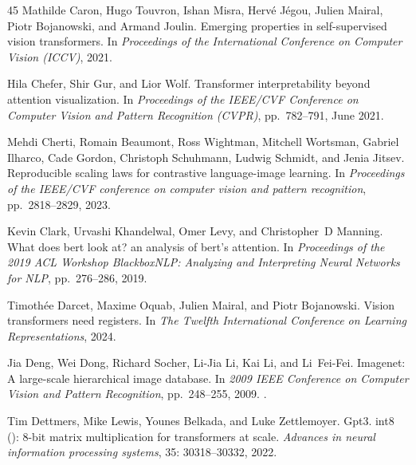\documentclass{article}
\begin{document}
\begin{thebibliography}{45}
Mathilde Caron, Hugo Touvron, Ishan Misra, Herv\'e J\'egou, Julien Mairal, Piotr Bojanowski, and Armand Joulin.
\newblock Emerging properties in self-supervised vision transformers.
\newblock In \emph{Proceedings of the International Conference on Computer Vision (ICCV)}, 2021.

Hila Chefer, Shir Gur, and Lior Wolf.
\newblock Transformer interpretability beyond attention visualization.
\newblock In \emph{Proceedings of the IEEE/CVF Conference on Computer Vision and Pattern Recognition (CVPR)}, pp.\  782--791, June 2021.

Mehdi Cherti, Romain Beaumont, Ross Wightman, Mitchell Wortsman, Gabriel Ilharco, Cade Gordon, Christoph Schuhmann, Ludwig Schmidt, and Jenia Jitsev.
\newblock Reproducible scaling laws for contrastive language-image learning.
\newblock In \emph{Proceedings of the IEEE/CVF conference on computer vision and pattern recognition}, pp.\  2818--2829, 2023.

Kevin Clark, Urvashi Khandelwal, Omer Levy, and Christopher~D Manning.
\newblock What does bert look at? an analysis of bert’s attention.
\newblock In \emph{Proceedings of the 2019 ACL Workshop BlackboxNLP: Analyzing and Interpreting Neural Networks for NLP}, pp.\  276--286, 2019.

Timoth{\'e}e Darcet, Maxime Oquab, Julien Mairal, and Piotr Bojanowski.
\newblock Vision transformers need registers.
\newblock In \emph{The Twelfth International Conference on Learning Representations}, 2024.

Jia Deng, Wei Dong, Richard Socher, Li-Jia Li, Kai Li, and Li~Fei-Fei.
\newblock Imagenet: A large-scale hierarchical image database.
\newblock In \emph{2009 IEEE Conference on Computer Vision and Pattern Recognition}, pp.\  248--255, 2009.
\newblock {}.

Tim Dettmers, Mike Lewis, Younes Belkada, and Luke Zettlemoyer.
\newblock Gpt3. int8 (): 8-bit matrix multiplication for transformers at scale.
\newblock \emph{Advances in neural information processing systems}, 35: 30318--30332, 2022.


\end{thebibliography}
\end{document}
